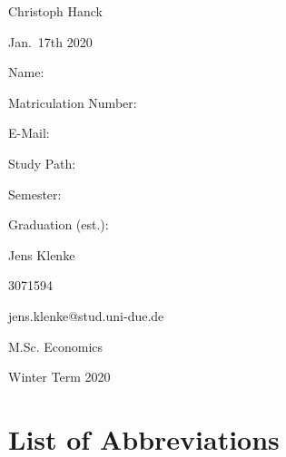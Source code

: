 \documentclass[12pt,a4paper]{article}
\begin{document}
\begin{titlepage}
  \noindent\begin{minipage}[t]{0.3\textwidth}
  \end{minipage}
  \begin{minipage}[t]{0.7\textwidth}
  \hspace{1cm}Christoph Hanck
  \end{minipage}

  \noindent\begin{minipage}[t]{0.3\textwidth}
  \end{minipage}
  \begin{minipage}[t]{0.7\textwidth}
  \hspace{1cm}Jan.~17th 2020
  \end{minipage}

  \hrulefill

  \begin{multicols}{2}

  Name:

  Matriculation Number:

  E-Mail:

  Study Path:

  Semester:

  Graduation (est.):
 
  \columnbreak

  Jens Klenke

  3071594
  
  jens.klenke@stud.uni-due.de

  M.Sc. Economics


  Winter Term 2020

	\end{multicols}

\end{titlepage}



{
\hypersetup{linkcolor=black}

\setcounter{tocdepth}{3}
\tableofcontents
}

\newpage
\listoffigures
{}

\listoftables
{}

\section*{List of Abbreviations}
\end{document}
